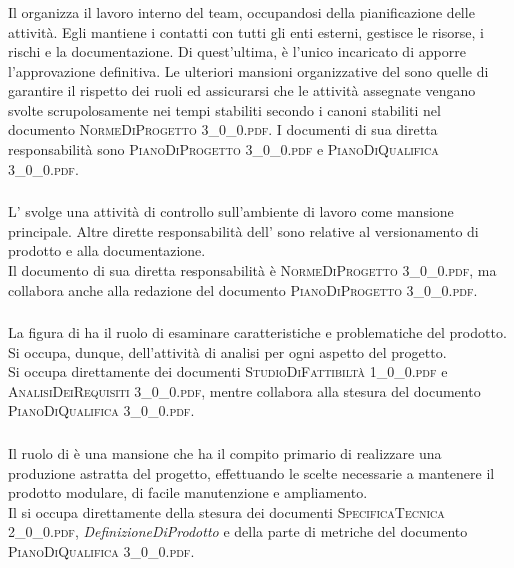 		\subsubsection{\RdP}
		Il \textit{\RdP} organizza il lavoro interno del team, occupandosi della pianificazione delle attività. Egli mantiene i contatti con tutti gli enti esterni, gestisce le risorse, i rischi e la documentazione. Di quest'ultima, è l'unico incaricato di apporre l'approvazione definitiva. Le ulteriori mansioni organizzative del \textit{\RdP} sono quelle di garantire il rispetto dei ruoli ed assicurarsi che le attività assegnate vengano svolte scrupolosamente nei tempi stabiliti secondo i canoni stabiliti nel documento \textsc{NormeDiProgetto 3\_0\_0.pdf}. I documenti di sua diretta responsabilità sono \textsc{PianoDiProgetto 3\_0\_0.pdf} e \textsc{PianoDiQualifica 3\_0\_0.pdf}.

		\subsubsection{\Amm}
		L'\textit{\Amm} svolge una attività di controllo sull'ambiente di lavoro come mansione principale. Altre dirette responsabilità dell'\textit{\Amm} sono relative al versionamento di prodotto e alla documentazione.\\
		Il documento di sua diretta responsabilità è \textsc{NormeDiProgetto 3\_0\_0.pdf}, ma collabora anche alla redazione del documento \textsc{PianoDiProgetto 3\_0\_0.pdf}.
		
		\subsubsection{\Ana}
		La figura di \textit{\Ana} ha il ruolo di esaminare caratteristiche e problematiche del prodotto. Si occupa, dunque, dell'attività di analisi per ogni aspetto del progetto.\\
		Si occupa direttamente dei documenti \textsc{StudioDiFattibiltà 1\_0\_0.pdf} e \textsc{AnalisiDeiRequisiti 3\_0\_0.pdf}, mentre collabora alla stesura del documento \textsc{PianoDiQualifica 3\_0\_0.pdf}.

		\subsubsection{\Prog}
		Il ruolo di \textit{\Prog} è una mansione che ha il compito primario di realizzare una produzione astratta del progetto, effettuando le scelte necessarie a mantenere il prodotto modulare, di facile manutenzione e ampliamento.\\
		Il \textit{\Prog} si occupa direttamente della stesura dei documenti \textsc{SpecificaTecnica 2\_0\_0.pdf}, \textit{DefinizioneDiProdotto} e della parte di metriche del documento \textsc{PianoDiQualifica 3\_0\_0.pdf}.
		
